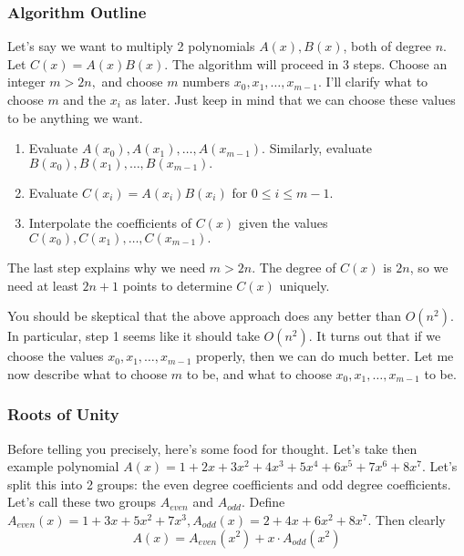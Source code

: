 \subsubsection{Algorithm Outline}

Let's say we want to multiply 2 polynomials $A(x), B(x)$, both of degree $n$. Let $C(x) = A(x)B(x).$ The algorithm will proceed in 3 steps. Choose an integer $m > 2n,$ and choose $m$ numbers $x_0, x_1, \dots, x_{m-1}.$ I'll clarify what to choose $m$ and the $x_i$ as later. Just keep in mind that we can choose these values to be anything we want.

\begin{enumerate}

\item Evaluate $A(x_0), A(x_1), \dots, A(x_{m-1}).$ Similarly, evaluate $B(x_0), B(x_1), \dots, B(x_{m-1}).$

\item Evaluate $C(x_i) = A(x_i)B(x_i)$ for $0 \le i \le m-1.$

\item Interpolate the coefficients of $C(x)$ given the values $C(x_0), C(x_1), \dots, C(x_{m-1}).$

\end{enumerate}

The last step explains why we need $m > 2n.$ The degree of $C(x)$ is $2n$, so we need at least $2n+1$ points to determine $C(x)$ uniquely.

You should be skeptical that the above approach does any better than $O(n^2).$ In particular, step 1 seems like it should take $O(n^2).$ It turns out that if we choose the values $x_0, x_1, \dots, x_{m-1}$ properly, then we can do much better. Let me now describe what to choose $m$ to be, and what to choose $x_0, x_1, \dots, x_{m-1}$ to be.

\subsubsection{Roots of Unity}

Before telling you precisely, here's some food for thought. Let's take then example polynomial $A(x) = 1+2x+3x^2+4x^3+5x^4+6x^5+7x^6+8x^7.$ Let's split this into 2 groups: the even degree coefficients and odd degree coefficients. Let's call these two groups $A_{even}$ and $A_{odd}.$ Define $A_{even}(x) = 1+3x+5x^2+7x^3, A_{odd}(x) = 2+4x+6x^2+8x^7.$ Then clearly \[ A(x) = A_{even}(x^2) + x \cdot A_{odd}(x^2) \]

